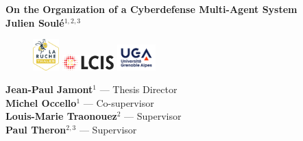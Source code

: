 \documentclass[12pt,a4paper]{article}
\begin{document}
\begin{center}
    \Huge\bfseries On the Organization of a Cyberdefense Multi-Agent System\\[0.8cm]
    \LARGE Julien Soulé$^{1,2,3}$\\[0.6cm]
    \normalsize
\end{center}

\begin{figure}[ht!]
    \centering
    \begin{minipage}{0.25\textwidth}
        \centering
        
    \end{minipage}\hfill
    \begin{minipage}{0.25\textwidth}
        \centering
        \includegraphics[height=1.2cm]{logos/la-ruche_logo.png}
    \end{minipage}\hfill
    \begin{minipage}{0.25\textwidth}
        \centering
        \includegraphics[height=0.6cm]{logos/lcis_logo.png}
    \end{minipage}\hfill
    \begin{minipage}{0.25\textwidth}
        \centering
        \includegraphics[height=1cm]{logos/uga_logo.jpg}
    \end{minipage}
\end{figure}


\begin{center}
    \textbf{Jean-Paul Jamont}$^{1}$ — Thesis Director\\
    \textbf{Michel Occello}$^{1}$ — Co-supervisor\\
    \textbf{Louis-Marie Traonouez}$^{2}$ — Supervisor\\
    \textbf{Paul Theron}$^{2,3}$ — Supervisor\\
\end{center}
\end{document}
